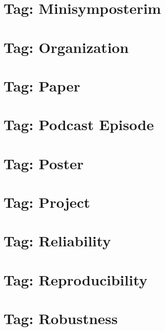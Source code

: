 \documentclass[twoside]{book}
\newcommand{\+}{\discretionary{\mbox{\scriptsize$\hookleftarrow$}}{}{}}
\begin{document}
\chapter{Tag\+: Minisymposterim}
\label{md_markdown_tag_minisymposterim}

\chapter{Tag\+: Organization}
\label{md_markdown_tag_organization}

\chapter{Tag\+: Paper}
\label{md_markdown_tag_paper}

\chapter{Tag\+: Podcast Episode}
\label{md_markdown_tag_podcast-episode}

\chapter{Tag\+: Poster}
\label{md_markdown_tag_poster}

\chapter{Tag\+: Project}
\label{md_markdown_tag_project}

\chapter{Tag\+: Reliability}
\label{md_markdown_tag_reliability}

\chapter{Tag\+: Reproducibility}
\label{md_markdown_tag_reproducibility}

\chapter{Tag\+: Robustness}
\label{md_markdown_tag_robustness}

\end{document}

